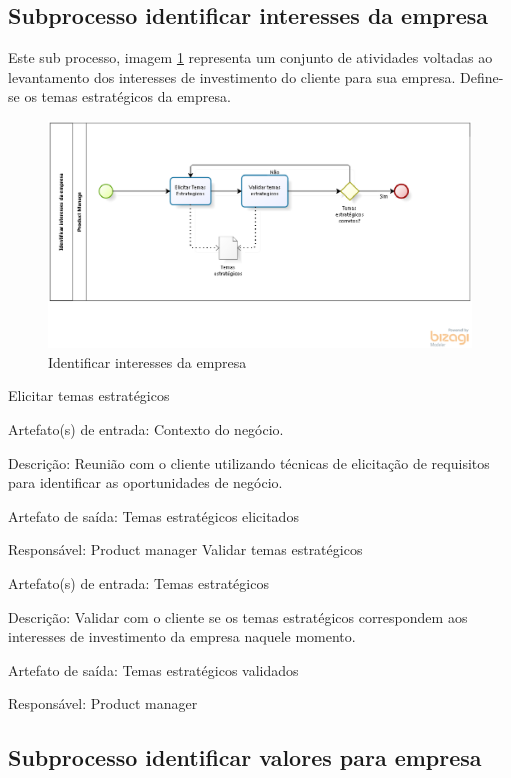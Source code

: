 \subsection{Subprocesso identificar interesses da empresa}

Este sub processo, imagem \ref{processoInteresses} representa um conjunto de atividades voltadas ao levantamento dos interesses de investimento do cliente para sua empresa. Define-se os temas estratégicos da empresa.

\begin{figure}[H]
    \centering
    \caption{Identificar interesses da empresa}
    \label{processoInteresses}
    \includegraphics[keepaspectratio=true,scale=0.5]{figuras/processoInteresses.eps}
\end{figure}


Elicitar temas estratégicos

Artefato(s) de entrada: Contexto do negócio.

Descrição: Reunião com o cliente utilizando técnicas de elicitação de requisitos para identificar as oportunidades de negócio.

Artefato de saída: Temas estratégicos elicitados

Responsável: Product manager
Validar temas estratégicos

Artefato(s) de entrada: Temas estratégicos

Descrição: Validar com o cliente se os temas estratégicos correspondem aos interesses de investimento da empresa naquele momento.

Artefato de saída: Temas estratégicos validados

Responsável: Product manager

\subsection{ Subprocesso identificar valores para empresa}

